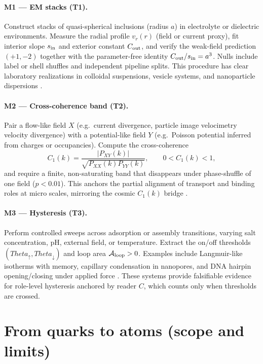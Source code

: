 \documentclass[12pt,a4paper,oneside]{scrreprt}
\def\Theta{Theta}%
\begin{document}
\paragraph{M1 — EM stacks (T1).} 
Construct stacks of quasi-spherical inclusions (radius $a$) 
in electrolyte or dielectric environments. 
Measure the radial profile $v_r(r)$ (field or current proxy), 
fit interior slope $s_{\rm in}$ and exterior constant $C_{\rm out}$, 
and verify the weak-field prediction $(+1,-2)$ together with the 
parameter-free identity $C_{\rm out}/s_{\rm in}=a^3$. 
Nulls include label or shell shuffles and independent pipeline splits. 
This procedure has clear laboratory realizations in colloidal 
suspensions, vesicle systems, and nanoparticle dispersions 
\citep{Hunter2001ColloidSci,Israelachvili2011Intermolecular}. 

\paragraph{M2 — Cross-coherence band (T2).} 
Pair a flow-like field $X$ (e.g.\ current divergence, 
particle image velocimetry velocity divergence) with a potential-like 
field $Y$ (e.g.\ Poisson potential inferred from charges or occupancies). 
Compute the cross-coherence
\[
C_1(k) = \frac{|P_{XY}(k)|}{\sqrt{P_{XX}(k)P_{YY}(k)}}, \qquad 0<C_1(k)<1,
\]
and require a finite, non-saturating band that disappears under 
phase-shuffle of one field ($p<0.01$). 
This anchors the partial alignment of transport and binding roles 
at micro scales, mirroring the cosmic $C_1(k)$ bridge 
\citep{Whitesides2002SelfAssembly}. 

\paragraph{M3 — Hysteresis (T3).} 
Perform controlled sweeps across adsorption or assembly transitions, 
varying salt concentration, pH, external field, or temperature. 
Extract the on/off thresholds $(\Theta_\uparrow,\Theta_\downarrow)$ 
and loop area $\mathcal A_{\rm loop}>0$. 
Examples include Langmuir-like isotherms with memory, 
capillary condensation in nanopores, and DNA hairpin opening/closing 
under applied force \citep{Liphardt2001RNA,Li2019Capillary}. 
These systems provide falsifiable evidence for 
role-level hysteresis anchored by reader $C$, 
which counts only when thresholds are crossed. 

\section{From quarks to atoms (scope and limits)}\label{sec:micro-scope}
\end{document}
